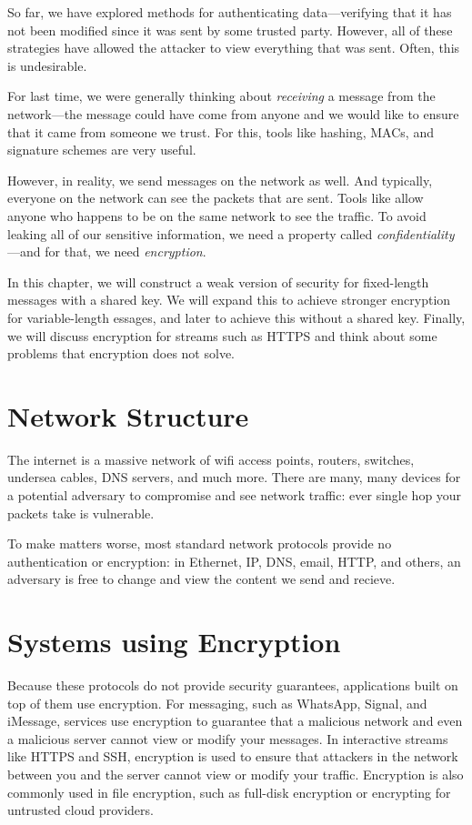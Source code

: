 So far, we have explored methods for authenticating data---verifying that it has not been modified since it was sent by some trusted party. However, all of these strategies have allowed the attacker to view everything that was sent. Often, this is undesirable. 

For last time, we were generally thinking about \emph{receiving} a message from the network---the message could have come from anyone and we would like to ensure that it came from someone we trust. For this, tools like hashing, MACs, and signature schemes are very useful.

However, in reality, we send messages on the network as well. And typically, everyone on the network can see the packets that are sent. Tools like  allow anyone who happens to be on the same network to see the traffic. To avoid leaking all of our sensitive information, we need a property called \emph{confidentiality}---and for that, we need \emph{encryption}.


In this chapter, we will construct a weak version of security for fixed-length messages with a shared key. We will expand this to achieve stronger encryption for variable-length essages, and later to achieve this without a shared key. Finally, we will discuss encryption for streams such as HTTPS and think about some problems that encryption does not solve.

\section{Network Structure}
The internet is a massive network of wifi access points, routers, switches, undersea cables, DNS servers, and much more. There are many, many devices for a potential adversary to compromise and see network traffic: ever single hop your packets take is vulnerable.

To make matters worse, most standard network protocols provide no authentication or encryption: in Ethernet, IP, DNS, email, HTTP, and others, an adversary is free to change and view the content we send and recieve.

\section{Systems using Encryption}
Because these protocols do not provide security guarantees, applications built on top of them use encryption. For messaging, such as WhatsApp, Signal, and iMessage, services use encryption to guarantee that a malicious network and even a malicious server cannot view or modify your messages. In interactive streams like HTTPS and SSH, encryption is used to ensure that attackers in the network between you and the server cannot view or modify your traffic. Encryption is also commonly used in file encryption, such as full-disk encryption or encrypting for untrusted cloud providers.

